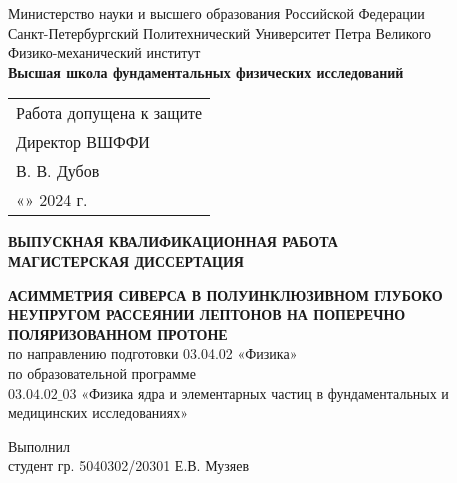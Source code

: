 \begin{titlepage}
    \begin{center}
	Министерство науки и высшего образования Российской Федерации\\Санкт-Петербургский Политехнический Университет Петра Великого \\ Физико-механический институт \\ \textbf{Высшая школа фундаментальных физических исследований} 
\end{center}
\begin{flushright}
\begin{tabular}{l}
Работа допущена к защите\\Директор ВШФФИ \vspace{0.3cm} \\
\underline{\hspace{3.5cm}} В. В. Дубов \vspace{0.5cm}\\
«\underline{\hspace{1cm}}»\underline{\hspace{3cm}} 2024 г.
\end{tabular}
\end{flushright}
\vspace{0.3cm}
{ \begin{center}
\vspace{0.3cm}
\MakeUppercase{\textbf{выпускная квалификационная работа \\ магистерская диссертация}}\\
\vspace{0.3cm}

\MakeUppercase{\textbf{Асимметрия Сиверса в полуинклюзивном глубоко неупругом рассеянии лептонов на поперечно поляризованном протоне}}
\\
\vspace{0.5cm}
по направлению подготовки 03.04.02 «Физика»
\\
по образовательной программе
\\
$03.04.02\_03$ «Физика ядра и элементарных частиц в фундаментальных и медицинских исследованиях»
\end{center}
}
\vspace{0.3cm}

\begin{flushleft}
Выполнил \\
студент гр. 5040302/20301 \hspace{0.3cm} %
\hfill  Е.В. Музяев
\vspace{0.5cm}



\end{flushleft}
\end{titlepage}
